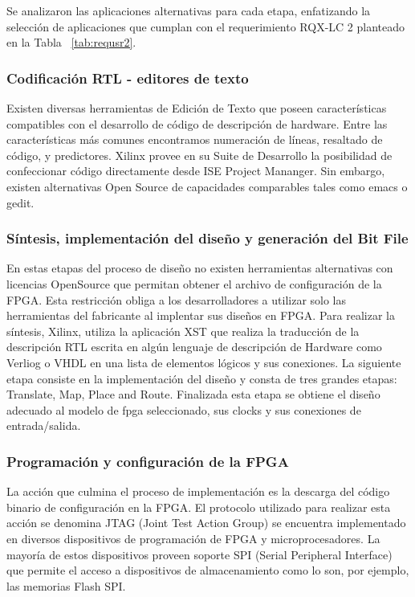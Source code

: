 				Se analizaron las aplicaciones alternativas para cada etapa, enfatizando la selección de aplicaciones que cumplan con el requerimiento RQX-LC 2
				planteado en la Tabla ~\ref{tab:requsr2}.   
				
				\subsubsection {Codificación RTL - editores de texto}
				Existen diversas herramientas de Edición de Texto que poseen características compatibles con el desarrollo de código de descripción de hardware.
				Entre las características más comunes encontramos numeración de líneas, resaltado de código, y predictores. 
				Xilinx provee en su Suite de Desarrollo la posibilidad de confeccionar código directamente desde ISE Project Mananger. Sin embargo,
				existen alternativas Open Source de capacidades comparables tales como emacs o gedit. 
				
				\subsubsection {Síntesis, implementación del diseño y generación del Bit File}
				En estas etapas del proceso de diseño no existen herramientas alternativas con licencias OpenSource que permitan obtener el archivo de
				configuración de la FPGA. Esta restricción obliga a los desarrolladores a utilizar solo las herramientas del fabricante al implentar sus diseños
				en FPGA.
				Para realizar la síntesis, Xilinx, utiliza la aplicación XST que realiza la traducción de la descripción RTL escrita en algún lenguaje de
				descripción de Hardware como Verliog o VHDL en una lista de elementos lógicos y sus conexiones. La siguiente etapa consiste en la implementación 
				del diseño y consta de tres grandes etapas: Translate, Map, Place and Route. Finalizada esta etapa se obtiene el diseño adecuado al modelo de
				fpga seleccionado, sus clocks y sus conexiones de entrada/salida. 
				
				\subsubsection {Programación y configuración de la FPGA}
				La acción que culmina el proceso de implementación es la descarga del código binario de configuración en la FPGA. El protocolo utilizado para
				realizar esta acción se denomina JTAG (Joint Test Action Group) se encuentra implementado en diversos dispositivos de programación de FPGA y
				microprocesadores. La mayoría de estos dispositivos proveen soporte SPI (Serial Peripheral Interface) que permite el acceso a dispositivos de
				almacenamiento como lo son, por ejemplo, las memorias Flash SPI.
				

